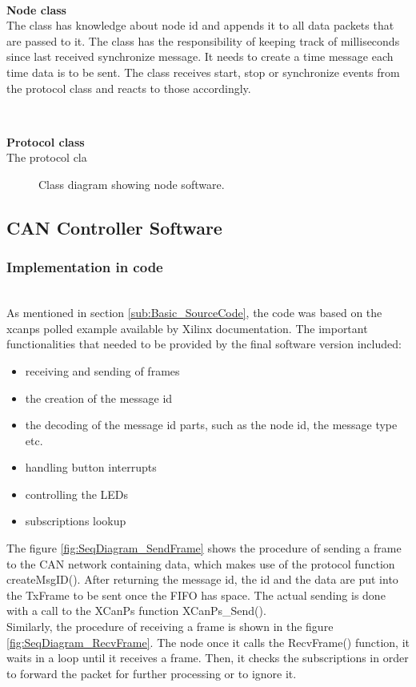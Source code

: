 ~\\ \par \textbf{Node class} ~ \\
The class has knowledge about node id and appends it to all data packets that are passed to it.
The class has the responsibility of keeping track of milliseconds since last received synchronize message.
It needs to create a time message each time data is to be sent.
The class receives start, stop or synchronize events from the protocol class and reacts to those accordingly.

~\\ \par \textbf{Protocol class} ~ \\
The protocol cla

\begin{figure}[!h]
\centering
{}
\caption{Class diagram showing node software.}
\label{fig:node_class_diagram}
\end{figure}

\subsection{CAN Controller Software}
\subsubsection{Implementation in code}~\\
As mentioned in section \ref{sub:Basic_SourceCode}, the code was based on the xcanps polled example available by Xilinx documentation.
The important functionalities that needed to be provided by the final software version included:

\begin{itemize}
\item receiving and sending of frames
\item the creation of the message id
\item the decoding of the message id parts, such as the node id, the message type etc. 
\item handling button interrupts
\item controlling the LEDs
\item subscriptions lookup
\end{itemize}
The figure \ref{fig:SeqDiagram_SendFrame} shows the procedure of sending a frame to the CAN network containing data, which makes use of the protocol function createMsgID().
After returning the message id, the id and the data are put into the TxFrame to be sent once the FIFO has space.
The actual sending is done with a call to the XCanPs function XCanPs\_Send().
\\
Similarly, the procedure of receiving a frame is shown in the figure \ref{fig:SeqDiagram_RecvFrame}.
The node once it calls the RecvFrame() function, it waits in a loop until it receives a frame. Then, it checks the subscriptions in order to forward the packet for further processing or to ignore it.


